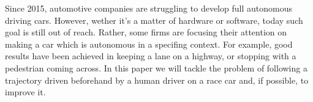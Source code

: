 Since 2015, automotive companies are struggling to develop full autonomous driving cars. However, wether it's a matter of hardware or software, today such goal is still out of reach. Rather, some firms are focusing their attention on making a car which is autonomous in a specifing context. For example, good results have been achieved in keeping a lane on a highway, or stopping with a pedestrian coming across. 
In this paper we will tackle the problem of following a trajectory driven beforehand by a human driver on a race car and, if possible, to improve it.



